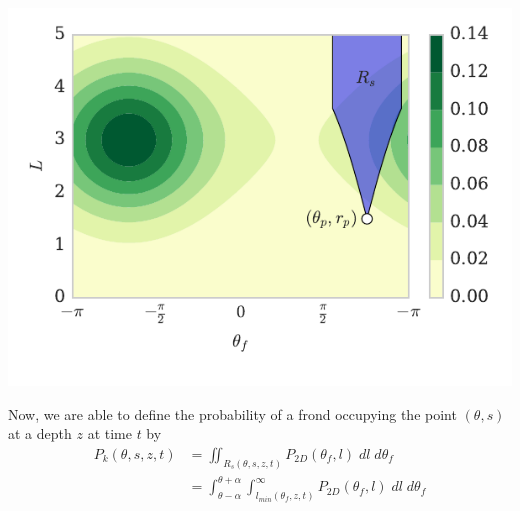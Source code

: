 \documentclass[10pt]{article}
\newenvironment{mcfig}
	{\par\medskip\noindent\minipage{\linewidth}}
	{\endminipage\par\medskip}
\begin{document}
\begin{multicols}{2}
\begin{mcfig}
	\centering
	\includegraphics[width=\linewidth]{cart_shade}
	\vspace{-3em}
	\label{fig:cart_shade}
\end{mcfig}

Now, we are able to define the probability of a frond occupying the point $(\theta,s)$ at a depth $z$ at time $t$ by
\begin{align}
		P_k(\theta,s,z,t)	&= \iint_{R_s(\theta,s,z,t)}
								P_{2D}(\theta_f,l)
								\;dl\;d\theta_f \nonumber \\
							&= \int_{\theta-\alpha}^{\theta+\alpha} 
								\int_{l_{min}(\theta_f,z,t)}^\infty
								P_{2D}(\theta_f,l)
								\;dl\;d\theta_f
\end{align}


\end{multicols}
\end{document}
